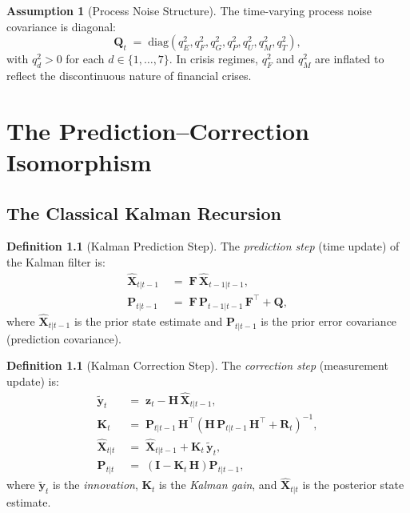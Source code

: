 \documentclass[12pt,openany]{book}
\newcommand{\calE}{\mathcal{E}}
\newcommand{\calF}{\mathcal{F}}
\newcommand{\calG}{\mathcal{G}}
\newcommand{\calP}{\mathcal{P}}
\newcommand{\calU}{\mathcal{U}}
\newcommand{\calM}{\mathcal{M}}
\newcommand{\calT}{\mathcal{T}}
\numberwithin{equation}{chapter}
\theoremstyle{plain}
\theoremstyle{definition}
\newtheorem{definition}[theorem]{Definition}
\newtheorem{assumption}[theorem]{Assumption}
\theoremstyle{remark}
\def\mathcal#1{#1}%
\begin{document}
\begin{assumption}[Process Noise Structure]
\label{asm:process-noise}
The time-varying process noise covariance is diagonal:
\begin{equation}
  \mathbf{Q}_t \;=\; \mathrm{diag}(q_{\calE}^2, q_{\calF}^2,
  q_{\calG}^2, q_{\calP}^2, q_{\calU}^2, q_{\calM}^2,
  q_{\calT}^2),
  \label{eq:process-noise}
\end{equation}
with $q_d^2 > 0$ for each $d \in \{1, \ldots, 7\}$.  In crisis
regimes, $q_{\calF}^2$ and $q_{\calM}^2$ are inflated to reflect
the discontinuous nature of financial crises.
\end{assumption}

\chapter{The Prediction--Correction Isomorphism}
\label{ch:isomorphism}

\section{The Classical Kalman Recursion}

\begin{definition}[Kalman Prediction Step]
\label{def:kalman-predict}
The \emph{prediction step} (time update) of the Kalman filter is:
\begin{align}
  \hat{\mathbf{X}}_{t|t-1}
  &\;=\; \mathbf{F}\,\hat{\mathbf{X}}_{t-1|t-1},
  \label{eq:predict-state} \\
  \mathbf{P}_{t|t-1}
  &\;=\; \mathbf{F}\,\mathbf{P}_{t-1|t-1}\,\mathbf{F}^\top
         + \mathbf{Q},
  \label{eq:predict-cov}
\end{align}
where $\hat{\mathbf{X}}_{t|t-1}$ is the prior state estimate and
$\mathbf{P}_{t|t-1}$ is the prior error covariance (prediction
covariance).
\end{definition}

\begin{definition}[Kalman Correction Step]
\label{def:kalman-correct}
The \emph{correction step} (measurement update) is:
\begin{align}
  \tilde{\mathbf{y}}_t
  &\;=\; \mathbf{z}_t - \mathbf{H}\,\hat{\mathbf{X}}_{t|t-1},
  \label{eq:innovation} \\
  \mathbf{K}_t
  &\;=\; \mathbf{P}_{t|t-1}\,\mathbf{H}^\top
         \!\left(\mathbf{H}\,\mathbf{P}_{t|t-1}\,\mathbf{H}^\top
         + \mathbf{R}_t\right)^{-1},
  \label{eq:kalman-gain} \\
  \hat{\mathbf{X}}_{t|t}
  &\;=\; \hat{\mathbf{X}}_{t|t-1} + \mathbf{K}_t\,\tilde{\mathbf{y}}_t,
  \label{eq:update-state} \\
  \mathbf{P}_{t|t}
  &\;=\; \left(\mathbf{I} - \mathbf{K}_t\,\mathbf{H}\right)
         \mathbf{P}_{t|t-1},
  \label{eq:update-cov}
\end{align}
where $\tilde{\mathbf{y}}_t$ is the \emph{innovation},
$\mathbf{K}_t$ is the \emph{Kalman gain}, and
$\hat{\mathbf{X}}_{t|t}$ is the posterior state estimate.
\end{definition}
\end{document}
